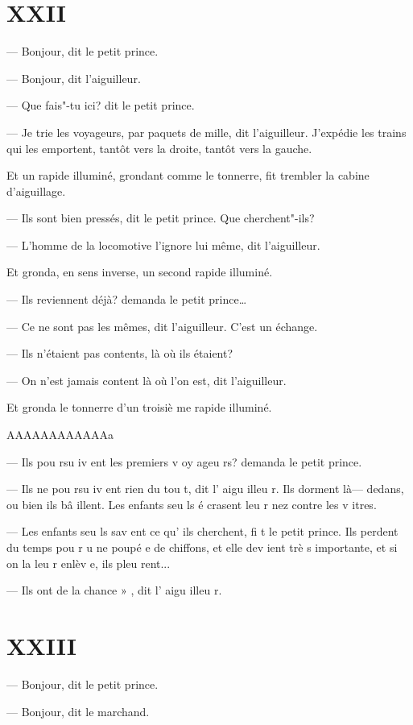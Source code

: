 \section{XXII}

--- Bonjour, dit le petit prince.

--- Bonjour, dit l'aiguilleur.

--- Que fais"-tu ici? dit le petit prince.

--- Je trie les voyageurs, par paquets de mille, dit l'aiguilleur. J'expédie les
trains qui les emportent, tantôt vers la droite, tantôt vers la gauche.

Et un rapide illuminé, grondant comme le tonnerre, fit trembler la cabine d'aiguillage.

--- Ils sont bien pressés, dit le petit prince. Que cherchent"-ils?

--- L'homme de la locomotive l'ignore lui même, dit l'aiguilleur.

Et gronda, en sens inverse, un second rapide illuminé.

--- Ils reviennent déjà? demanda le petit prince\ldots{}

--- Ce ne sont pas les mêmes, dit l'aiguilleur. C'est un échange.

--- Ils n'étaient pas contents, là où ils étaient?

--- On n'est jamais content là où l'on est, dit l'aiguilleur.

Et gronda le tonnerre d'un troisiè me rapide illuminé.

AAAAAAAAAAAAa

--- Ils pou rsu iv ent les premiers v oy ageu rs? demanda le petit prince.

--- Ils ne pou rsu iv ent rien du tou t, dit l’ aigu illeu r. Ils dorment là— dedans, ou bien ils bâ illent. Les enfants seu ls é crasent leu r nez contre les v itres.

--- Les enfants seu ls sav ent ce qu’ ils cherchent, fi t le petit prince. Ils perdent du temps pou r u ne poupé e de chiffons, et elle dev ient trè s importante, et si on la leu r enlèv e, ils pleu rent...

--- Ils ont de la chance » , dit l’ aigu illeu r.

\section{XXIII}

--- Bonjour, dit le petit prince.

--- Bonjour, dit le marchand.

